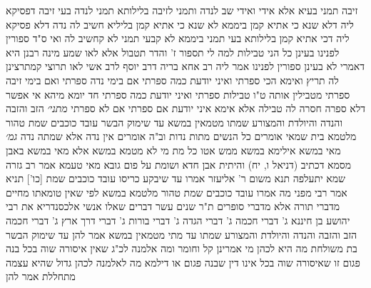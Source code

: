 \documentclass[12pt, openany]{book}
\begin{document}
{זיבה תמני בעיא  אלא אידי ואידי שב לנדה ותמני לזיבה
בלילותא תמני לנדה בעי 
זיבה דפסיקא ליה דלא שנא כי אתיא קמן ביממא לא שנא כי אתיא קמן בליליא חשיב לה  נדה דלא פסיקא ליה דכי אתיא קמן בלילותא בעי תמני ביממא לא קבעי תמני לא קחשיב לה 
ואי ס"ד ספורין לפנינו בעינן כל הני טבילות למה לי  תספור ז' והדר תטבול  אלא לאו שמע מינה רבנן היא דאמרי לא בעינן ספורין לפנינו 
אמר ליה רב אחא בריה דרב יוסף לרב אשי  לאו תרוצי קמתרצינן לה  תריץ ואימא הכי ספרתי ואיני יודעת כמה ספרתי אם בימי נדה ספרתי ואם בימי זיבה ספרתי מטבילין אותה ט"ו טבילות 
ספרתי ואיני יודעת כמה ספרתי חד יומא מיהא אי אפשר דלא ספרה חסרה לה טבילה 
אלא אימא  איני יודעת אם ספרתי אם לא ספרתי
{\large\emph{מתני׳}} הזב והזבה והנדה והיולדת והמצורע שמתו מטמאין במשא עד שימוק הבשר עובד כוכבים שמת טהור מלטמא 
בית שמאי אומרים  כל הנשים מתות נדות  וב"ה אומרים  אין נדה אלא שמתה נדה
{\large\emph{גמ׳}} מאי במשא אילימא במשא ממש אטו כל מת מי לא מטמא במשא 
אלא  מאי במשא  באבן מסמא
דכתיב  (דניאל ו, יח) והיתית אבן חדא ושומת על פום גובא 
מאי טעמא  אמר רב  גזרה שמא יתעלפה 
תנא משום ר' אליעזר אמרו  עד שיבקע כריסו
עובד כוכבים שמת [כו'] תניא אמר רבי  מפני מה אמרו עובד כוכבים שמת טהור מלטמא במשא לפי שאין טומאתו מחיים מדברי תורה אלא מדברי סופרים 
ת"ר  שנים עשר דברים שאלו אנשי אלכסנדריא את רבי יהושע בן חיננא  ג' דברי חכמה ג' דברי הגדה ג' דברי בורות ג' דברי דרך ארץ 
ג' דברי חכמה  הזב והזבה והנדה והיולדת והמצורע שמתו עד מתי מטמאין במשא  אמר להן  עד שימוק הבשר 
בת משולחת מה היא לכהן 
מי אמרינן קל וחומר  ומה אלמנה לכ"ג שאין איסורה שוה בכל בנה פגום זו שאיסורה שוה בכל אינו דין שבנה פגום  או דילמא  מה לאלמנה לכהן גדול שהיא עצמה מתחללת 
אמר להן}
\end{document}
